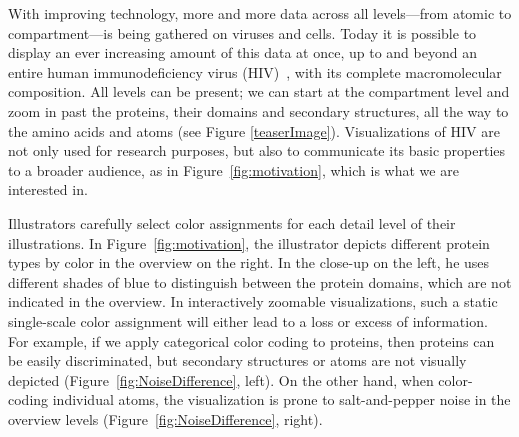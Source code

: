 \documentclass{egpubl}
\begin{document}
	With improving technology, more and more data across all levels---from atomic to compartment---is being gathered on viruses and cells. 
	Today it is possible to display an ever increasing amount of this data at once, up to and beyond an entire human immunodeficiency virus (HIV)~\cite{muzic2015cellview}, with its complete macromolecular composition.
	All levels can be present; we can start at the compartment level and zoom in past the proteins, their domains and secondary structures, all the way to the amino acids and atoms (see Figure \ref{teaserImage}). Visualizations of HIV are not only used for research purposes, but also to communicate its basic properties to a broader audience, as in Figure~\ref{fig:motivation}, which is what we are interested in.

	
	Illustrators carefully select color assignments for each detail level of their illustrations. 
	In Figure~\ref{fig:motivation}, the illustrator depicts different protein types by color in the overview on the right. 
	In the close-up on the left, he uses different shades of blue to distinguish between the protein domains, which are not indicated in the overview. 
	In interactively zoomable visualizations, such a static single-scale color assignment will either lead to a loss or excess of information. 
	For example, if we apply categorical color coding to proteins, then proteins can be easily discriminated, but secondary structures or atoms are not visually depicted (Figure~\ref{fig:NoiseDifference}, left).
	On the other hand, when color-coding individual atoms, the visualization is prone to salt-and-pepper noise in the overview levels (Figure~\ref{fig:NoiseDifference}, right).
	
\end{document}
